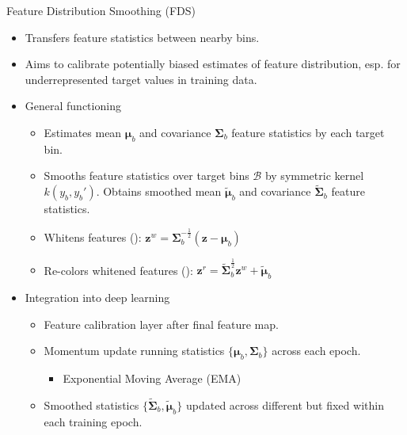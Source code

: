 \begin{frame}[shrink=4]{Feature Distribution Smoothing (FDS)}
	\begin{itemize}\setlength\itemsep{1.5em}
		\item<1-> Transfers feature statistics between nearby bins.
		\item<1-> Aims to calibrate potentially biased estimates of feature distribution, esp. for underrepresented target values in training data.
		\item<2-> General functioning
		\begin{itemize}
			\item Estimates mean $\bm{\mu}_b$ and covariance $\bm{\Sigma}_b$ feature statistics by each target bin.
			\item Smooths feature statistics over target bins $\mathcal{B}$ by symmetric kernel $k(y_b,y_b')$. Obtains smoothed mean $\tilde{\bm{\mu}}_b$ and covariance $\tilde{\bm{\Sigma}}_b$ feature statistics.
			\item Whitens features (\cite{sun2016return}): $\bm{z}^w = \bm{\Sigma}_b^{-\frac{1}{2}}(\bm{z} - \bm{\mu}_b)$
			\item Re-colors whitened features (\cite{sun2016return}): $\bm{z}^r = \tilde{\bm{\Sigma}}_b^{\frac{1}{2}} \bm{z}^w + \tilde{\bm{\mu}}_b$
		\end{itemize}
		\item<3-> Integration into deep learning
		\begin{itemize}
			\item Feature calibration layer after final feature map.
			\item Momentum update running statistics $\{\bm{\mu}_b,\bm{\Sigma}_b\}$ across each epoch. 
			\begin{itemize}
				\item Exponential Moving Average (EMA)
			\end{itemize}
			\item Smoothed statistics $\{\tilde{\bm{\Sigma}}_b,\tilde{\bm{\mu}}_b\}$ updated across different but fixed within each training epoch.
		\end{itemize}
	\end{itemize}
\end{frame}
